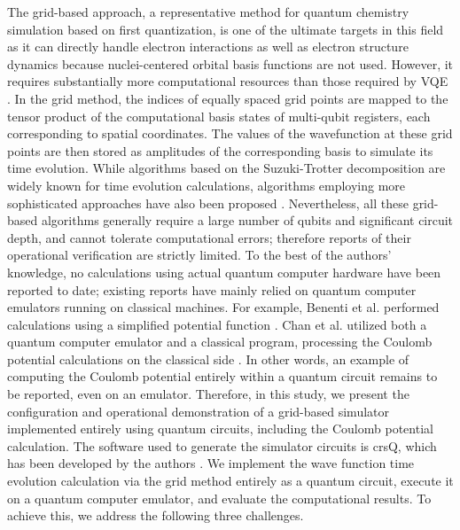 \documentclass[jctc-draft.tex]{subfiles}
\begin{document}
The grid-based approach, a representative method for quantum chemistry
simulation based on first quantization, is one of the ultimate targets in this
field as it can directly handle electron interactions as well as electron
structure dynamics because nuclei-centered orbital basis functions are not used.
However, it requires substantially more computational resources than those
required by VQE \cite{kassal2008.pnas.0808245105}. In the grid method, the
indices of equally spaced grid points are mapped to the tensor product of the
computational basis states of multi-qubit registers, each corresponding to
spatial coordinates. The values of the wavefunction at these grid points are
then stored as amplitudes of the corresponding basis to simulate its time
evolution. While algorithms based on the Suzuki-Trotter decomposition are widely
known for time evolution calculations, algorithms employing more sophisticated
approaches have also been proposed \cite{Berry2015.PhysRevLett.114.090502,
Babbush_2018, YuanSu.PRXQuantum.2.040332, eklund2026.arXiv2603.19007}.
Nevertheless, all these grid-based algorithms generally require a
large number of qubits and significant circuit depth, and cannot tolerate
computational errors; therefore reports of their operational verification are strictly
limited. To the best of the authors' knowledge, no calculations using actual
quantum computer hardware have been reported to date; existing reports have
mainly relied on quantum computer emulators running on classical machines. For example,
Benenti et al. performed calculations using a simplified potential function
\cite{Benenti2008.10.1119/1.2894532}. Chan et al. utilized both a quantum
computer emulator and a classical program, processing the Coulomb potential
calculations on the classical side \cite{Chan2023.sciadv.abo7484}. In other
words, an example of computing the Coulomb potential entirely within a quantum
circuit remains to be reported, even on an emulator. Therefore, in this
study, we present the configuration and operational demonstration of a
grid-based simulator implemented entirely using quantum circuits, including the
Coulomb potential calculation. The software used to generate the simulator
circuits is crsQ, which has been developed by the authors
\cite{takahashi2024.doi:10.1021/acs.jctc.4c00708}. We implement the wave
function time evolution calculation via the grid method entirely as a quantum
circuit, execute it on a quantum computer emulator, and evaluate the
computational results. To achieve this, we address the following three
challenges.
\end{document}
